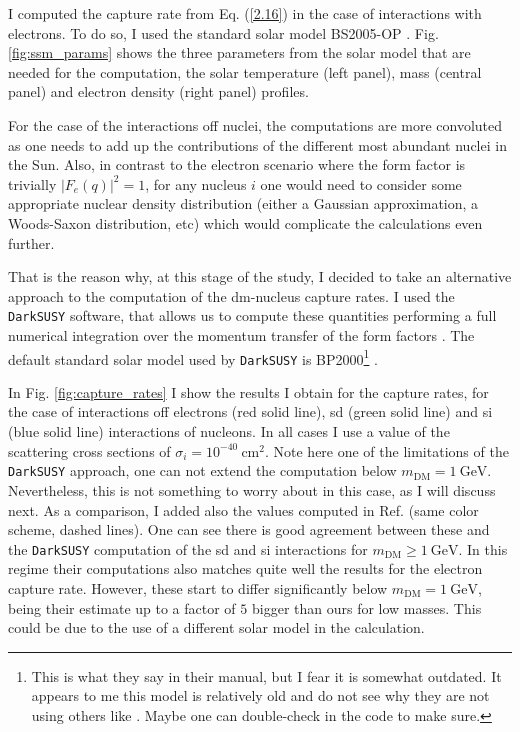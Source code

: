 I computed the capture rate from Eq. (\ref{2.16}) in the case of interactions with electrons. To do so, I used the standard solar model BS2005-OP \cite{Bahcall2004}. Fig. \ref{fig:ssm_params} shows the three parameters from the solar model that are needed for the computation, the solar temperature (left panel), mass (central panel) and electron density (right panel) profiles.

For the case of the interactions off nuclei, the computations are more convoluted as one needs to add up the contributions of the different most abundant nuclei in the Sun. Also, in contrast to the electron scenario where the form factor is trivially $|F_{e}(q)|^{2} = 1$, for any nucleus $i$ one would need to consider some appropriate nuclear density distribution (either a Gaussian approximation, a Woods-Saxon distribution, etc) which would complicate the calculations even further.

That is the reason why, at this stage of the study, I decided to take an alternative approach to the computation of the \gls{dm}-nucleus capture rates. I used the \texttt{DarkSUSY} software, that allows us to compute these quantities performing a full numerical integration over the momentum transfer of the form factors \cite{Bringmann2018}. The default standard solar model used by \texttt{DarkSUSY} is BP2000\footnote{This is what they say in their manual, but I fear it is somewhat outdated. It appears to me this model is relatively old and do not see why they are not using others like \cite{Bahcall2004}. Maybe one can double-check in the code to make sure.} \cite{Bahcall2000}.

In Fig. \ref{fig:capture_rates} I show the results I obtain for the capture rates, for the case of interactions off electrons (red solid line), \gls{sd} (green solid line) and \gls{si} (blue solid line) interactions of nucleons. In all cases I use a value of the scattering cross sections of $\sigma_{i} = 10^{-40} \ \mathrm{cm}^{2}$. Note here one of the limitations of the \texttt{DarkSUSY} approach, one can not extend the computation below $m_{\mathrm{DM}} = 1 \ \mathrm{GeV}$. Nevertheless, this is not something to worry about in this case, as I will discuss next. As a comparison, I added also the values computed in Ref. \cite{Palomares2017} (same color scheme, dashed lines). One can see there is good agreement between these and the \texttt{DarkSUSY} computation of the \gls{sd} and \gls{si} interactions for $m_{\mathrm{DM}} \geq 1 \ \mathrm{GeV}$. In this regime their computations also matches quite well the results for the electron capture rate. However, these start to differ significantly below $m_{\mathrm{DM}} = 1 \ \mathrm{GeV}$, being their estimate up to a factor of $5$ bigger than ours for low masses. This could be due to the use of a different solar model in the calculation.

